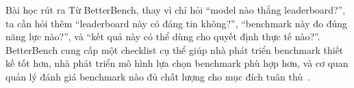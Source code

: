 \begin{summarybox}{Bài học rút ra}
Từ BetterBench, thay vì chỉ hỏi ``model nào thắng leaderboard?'', ta cần hỏi thêm ``leaderboard này có đáng tin không?'', ``benchmark này đo đúng năng lực nào?'', và ``kết quả này có thể dùng cho quyết định thực tế nào?''. BetterBench cung cấp một checklist cụ thể giúp nhà phát triển benchmark thiết kế tốt hơn, nhà phát triển mô hình lựa chọn benchmark phù hợp hơn, và cơ quan quản lý đánh giá benchmark nào đủ chất lượng cho mục đích tuân thủ~\cite{betterbench}.
\end{summarybox}